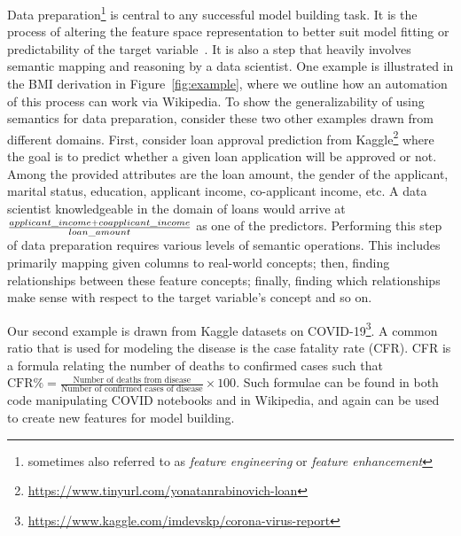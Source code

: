 \documentclass[sigconf, nonacm]{acmart}
\begin{document}
Data preparation\footnote{sometimes also referred to as {\em feature engineering} or {\em feature enhancement}} is central to any successful model building task. It is the process of altering the feature space representation to better suit model fitting or predictability of the target variable~\cite{fechapter}. It is also a step that heavily involves semantic mapping and reasoning by a data scientist. One example is illustrated in the BMI derivation in Figure~\ref{fig:example}, where we outline how an automation of this process can work via Wikipedia. To show the generalizability of using semantics for data preparation, consider these two other examples drawn from different domains. First, consider loan approval prediction from Kaggle\footnote{\url{https://www.tinyurl.com/yonatanrabinovich-loan}}%
where the goal is to predict whether a given loan application will be approved or not. Among the provided attributes are the loan amount, the gender of the applicant, marital status, education, applicant income, co-applicant income, etc. A data scientist knowledgeable in the domain of loans would arrive at ${applicant\_income + coapplicant\_income} \over {loan\_amount}$ as one of the predictors. Performing this step of data preparation requires various levels of semantic operations. This includes primarily mapping given columns to real-world concepts; then, finding relationships between these feature concepts; finally, finding which relationships make sense with respect to the target variable's concept and so on.

Our second example is drawn from Kaggle datasets on COVID-19\footnote{\url{https://www.kaggle.com/imdevskp/corona-virus-report}}.  A common ratio that is used for modeling the disease is the case fatality rate (CFR).  CFR is a formula relating the number of deaths to confirmed cases such that ${\text{CFR}}{\%}={\frac {\text{Number of deaths from disease}}{\text{Number of confirmed cases of disease}}}\times 100$.   Such formulae can be found in both code manipulating COVID notebooks and in Wikipedia, and again can be used to create new features for model building.
\end{document}
